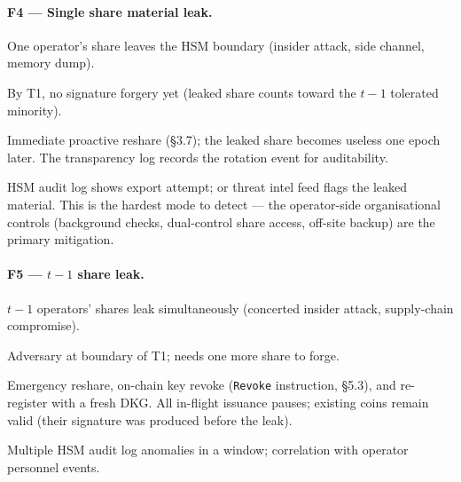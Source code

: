 \paragraph{F4 --- Single share material leak.}
\begin{description}[leftmargin=2em,style=nextline,itemsep=0pt]
  \item[Trigger] One operator's share leaves the HSM boundary
    (insider attack, side channel, memory dump).
  \item[Consequence] By T1, no signature forgery yet (leaked share
    counts toward the $t-1$ tolerated minority).
  \item[Recovery] Immediate proactive reshare (\S3.7); the leaked share
    becomes useless one epoch later. The transparency log records the
    rotation event for auditability.
  \item[Detection] HSM audit log shows export attempt; or threat intel
    feed flags the leaked material. This is the hardest mode to
    detect — the operator-side organisational controls (background
    checks, dual-control share access, off-site backup) are the
    primary mitigation.
\end{description}

\paragraph{F5 --- $t-1$ share leak.}
\begin{description}[leftmargin=2em,style=nextline,itemsep=0pt]
  \item[Trigger] $t-1$ operators' shares leak simultaneously (concerted
    insider attack, supply-chain compromise).
  \item[Consequence] Adversary at boundary of T1; needs one more
    share to forge.
  \item[Recovery] Emergency reshare, on-chain key revoke
    (\texttt{Revoke} instruction, \S5.3), and re-register with a fresh
    DKG. All in-flight issuance pauses; existing coins remain valid
    (their signature was produced before the leak).
  \item[Detection] Multiple HSM audit log anomalies in a window;
    correlation with operator personnel events.
\end{description}

